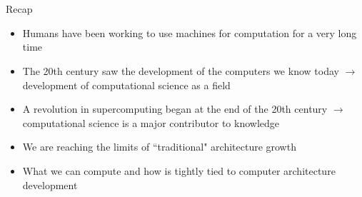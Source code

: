 \documentclass[xcolor=x11names,compress]{beamer}
\renewcommand{\(}{\begin{columns}}
\renewcommand{\)}{\end{columns}}
\newcommand{\<}[1]{\begin{column}{#1}}
\renewcommand{\>}{\end{column}}
\begin{document}
\section*{}
\begin{frame}{Recap}
\begin{itemize}
\item Humans have been working to use machines for computation for a very long time\vspace*{0.5 em}
\item The 20th century saw the development of the computers we know today $\rightarrow$ development of computational science as a field\vspace*{0.5 em}
\item A revolution in supercomputing began at the end of the 20th century $\rightarrow$ \alert{computational science is a major contributor to knowledge}\vspace*{0.5 em}
\item We are reaching the limits of ``traditional" architecture growth\vspace*{0.5 em}
\item What we can compute and how is tightly tied to computer architecture development
\end{itemize}
\end{frame}
\end{document}
